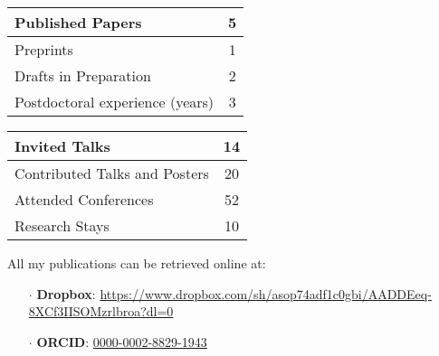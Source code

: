 \documentclass[a4paper]{article}
\begin{document}
		\begin{minipage}[t]{0.45\columnwidth}
		\center
	\begin{tabularx}{\linewidth}{|X|c|}
	\hline
	
	Published Papers & 5 \\
	\hline
	
	Preprints & 1 \\
	\hline
	
	Drafts in Preparation & 2 \\
	\hline
	
	Postdoctoral experience (years) & 3 \\
	\hline
	
	\end{tabularx}
		\end{minipage} 
		\hfill	
		\begin{minipage}[t]{0.45\columnwidth}
		\center
	\begin{tabularx}{\linewidth}{|X|c|}
	\hline
	
	Invited Talks & 14 \\
	\hline
	
	Contributed Talks and Posters & 20 \\
	\hline
	
	Attended Conferences & 52 \\
	\hline
	

	
	Research Stays & 10 \\
	\hline
	
	\end{tabularx}
		\end{minipage} 	
	\vspace{1em}	
	
	
	
	All my publications can be retrieved online at:
	\begin{itemize}[leftmargin=*, itemsep=0pt, parsep=0pt, topsep=0pt, partopsep=0pt]
		\item[$\cdot$] \textbf{Dropbox}: \url{https://www.dropbox.com/sh/asop74adf1c0gbi/AADDEeq-8XCf3IISOMzrlbroa?dl=0}
		\item[$\cdot$] \textbf{ORCID}: \href{https://orcid.org/0000-0002-8829-1943}{0000-0002-8829-1943}
	\end{itemize}
	\vspace{1em}


\end{document}
